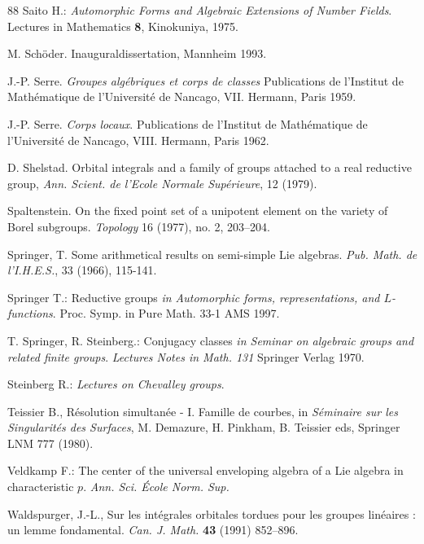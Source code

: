\documentclass[12pt,english]{smfart}
\numberwithin{equation}{subsection}
\theoremstyle{remark}
\begin{document}
\begin{thebibliography}{88}
Saito H.: {\em Automorphic Forms and Algebraic Extensions of Number Fields}.
    Lectures in Mathematics {\bf 8}, Kinokuniya, 1975.

 M. Sch\"{o}der. Inauguraldissertation, Mannheim 1993.

 J.-P. Serre. \emph{Groupes alg\'ebriques et corps de
    classes} Publications de l'Institut de Math\'ematique de l'Universit\'e de
Nancago, VII. Hermann, Paris 1959.

 J.-P. Serre. \emph{Corps locaux}. Publications de l'Institut de
    Math\'e\-matique de l'Universit\'e de Nancago, VIII. Hermann, Paris 1962.

 D. Shelstad. {Orbital integrals and a family of groups attached
    to a real reductive group}, {\em Ann. Scient. de l'Ecole Normale
    Sup\'erieure}, 12 (1979).

 Spaltenstein. On the fixed point set of a unipotent
 element on the variety of Borel subgroups. {\em Topology}  16  (1977),
 no. 2, 203--204.

 Springer, T. {Some arithmetical results on semi-simple
Lie algebras}. {\em Pub. Math. de l'I.H.E.S.}, 33 (1966), 115-141.

 Springer T.: {Reductive groups} {\em in Automorphic forms,
representations, and $L$-functions}. Proc. Symp. in Pure Math.
33-1 AMS 1997.

 T. Springer, R. Steinberg.: Conjugacy classes {\em in Seminar
    on algebraic groups and related finite groups}. {\em Lectures Notes in
    Math. 131} Springer Verlag 1970.

 {Steinberg R.}: {\em Lectures on Chevalley groups}.

 Teissier B., R\'esolution simultan\'ee - I. Famille de courbes, in
    {\em S\'eminaire sur les Singularit\'es des Surfaces}, M. Demazure, H.
    Pinkham, B. Teissier eds, Springer LNM 777 (1980).

 Veldkamp F.: {The center of the universal enveloping algebra of a
    Lie algebra in characteristic $p$}. {\em Ann. Sci. \'Ecole Norm. Sup.}

 Waldspurger, J.-L., {Sur les int\'egrales orbitales tordues
    pour les groupes lin\'eaires : un lemme fondamental.} \emph{Can. J.
    Math.} \textbf{43} (1991) 852--896.


\end{thebibliography}
\end{document}
